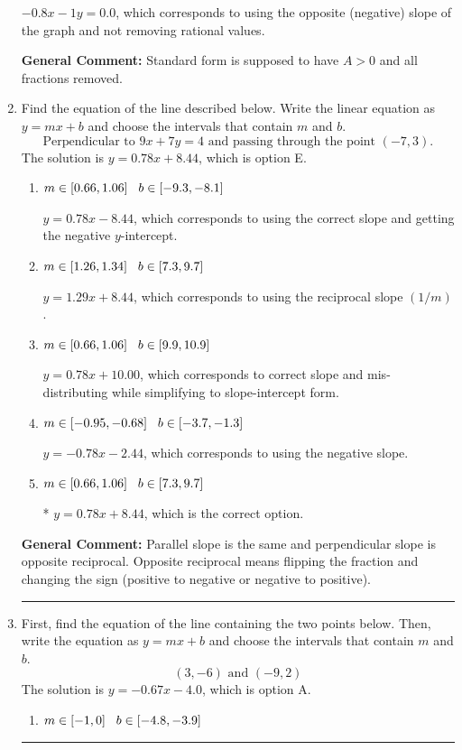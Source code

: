 \documentclass{extbook}[14pt]
\newcommand{\litem}[1]{\item #1

\rule{\textwidth}{0.4pt}}
\begin{document}
\begin{enumerate}
{\begin{enumerate}[label=\Alph*.]
 $-0.8x - 1y = 0.0$, which corresponds to using the opposite (negative) slope of the graph and not removing rational values.
\end{enumerate}

\textbf{General Comment:} Standard form is supposed to have $A > 0$ and all fractions removed.
}
\litem{
Find the equation of the line described below. Write the linear equation as $ y=mx+b $ and choose the intervals that contain $m$ and $b$.
\[ \text{Perpendicular to } 9 x + 7 y = 4 \text{ and passing through the point } (-7, 3). \]The solution is \( y = 0.78x + 8.44 \), which is option E.\begin{enumerate}[label=\Alph*.]
\item \( m \in [0.66, 1.06] \hspace*{3mm} b \in [-9.3, -8.1] \)

 $y = 0.78x - 8.44$, which corresponds to using the correct slope and getting the negative $y$-intercept.
\item \( m \in [1.26, 1.34] \hspace*{3mm} b \in [7.3, 9.7] \)

 $y = 1.29x + 8.44$, which corresponds to using the reciprocal slope $(1/m)$.
\item \( m \in [0.66, 1.06] \hspace*{3mm} b \in [9.9, 10.9] \)

 $y = 0.78x + 10.00$, which corresponds to correct slope and mis-distributing while simplifying to slope-intercept form.
\item \( m \in [-0.95, -0.68] \hspace*{3mm} b \in [-3.7, -1.3] \)

 $y = -0.78x - 2.44$, which corresponds to using the negative slope.
\item \( m \in [0.66, 1.06] \hspace*{3mm} b \in [7.3, 9.7] \)

* $y = 0.78x + 8.44$, which is the correct option.
\end{enumerate}

\textbf{General Comment:} Parallel slope is the same and perpendicular slope is opposite reciprocal. Opposite reciprocal means flipping the fraction and changing the sign (positive to negative or negative to positive).
}
\litem{
First, find the equation of the line containing the two points below. Then, write the equation as $ y=mx+b $ and choose the intervals that contain $m$ and $b$.
\[ (3, -6) \text{ and } (-9, 2) \]The solution is \( y = -0.67x -4.0 \), which is option A.\begin{enumerate}[label=\Alph*.]
\item \( m \in [-1, 0] \hspace*{3mm} b \in [-4.8, -3.9] \)


\end{enumerate}}
\end{enumerate}
\end{document}
